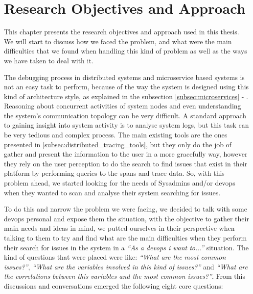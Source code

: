 \glsresetall
\chapter{Research Objectives and Approach}
\label{chap:research_objectives_and_approach}


This chapter presents the research objectives and approach used in this thesis. We will start to discuss how we faced the problem, and what were the main difficulties that we found when handling this kind of problem as well as the ways we have taken to deal with it.

The debugging process in distributed systems and microservice based systems is not an easy task to perform, because of the way the system is designed using this kind of architecture style, as explained in the subsection \ref{subsec:microservices} - . Reasoning about concurrent activities of system nodes and even understanding the system's communication topology can be very difficult. A standard approach to gaining insight into system activity is to analyse system logs, but this task can be very tedious and complex process. The main existing tools are the ones presented in \ref{subsec:distributed_tracing_tools}, but they only do the job of gather and present the information to the user in a more gracefully way, however they rely on the user perception to do the search to find issues that exist in their platform by performing queries to the spans and trace data. So, with this problem ahead, we started looking for the needs of Sysadmins and/or \gls{devops} when they wanted to scan and analyse their system searching for issues.

To do this and narrow the problem we were facing, we decided to talk with some \gls{devops} personal and expose them the situation, with the objective to gather their main needs and ideas in mind, we putted ourselves in their perspective when talking to them to try and find what are the main difficulties when they perform their search for issues in the system in a \textit{``As a \gls{devops} i want to...''} situation. The kind of questions that were placed were like: \textit{``What are the most common issues?''}, \textit{``What are the variables involved in this kind of issues?''} and \textit{``What are the correlations between this variables and the most common issues?''}. From this discussions and conversations emerged the following eight core questions:

